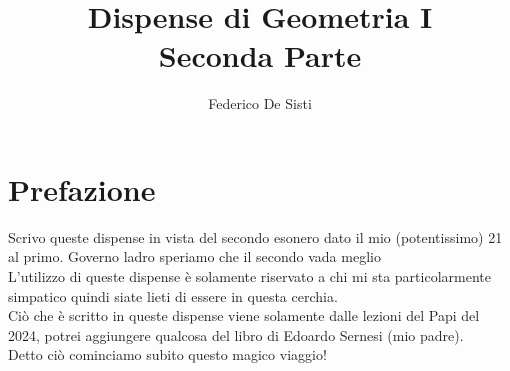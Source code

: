 \documentclass[12px]{article}
\title{Dispense di Geometria I
\\\large{Seconda Parte}}
\author{Federico De Sisti}
\date{}
\begin{document}
	\maketitle
	\newpage
	\section{Prefazione}
	Scrivo queste dispense in vista del secondo esonero dato il mio (potentissimo) 21 al primo. Governo ladro speriamo che il secondo vada meglio\\[10px]
	L'utilizzo di queste dispense è solamente riservato a chi mi sta particolarmente simpatico quindi siate lieti di essere in questa cerchia.\\[10px]
	Ciò che è scritto in queste dispense viene solamente dalle lezioni del Papi del 2024, potrei aggiungere qualcosa del libro di Edoardo Sernesi (mio padre).\\
	Detto ciò cominciamo subito questo magico viaggio!
	\newpage
\end{document}
